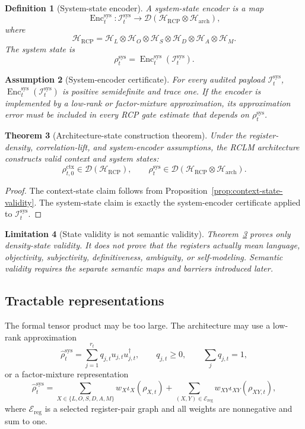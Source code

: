 \documentclass[11pt,a4paper]{article}
\newtheorem{theorem}{Theorem}[section]
\newtheorem{definition}[theorem]{Definition}
\newtheorem{assumption}[theorem]{Assumption}
\newtheorem{limitation}[theorem]{Limitation}
\newcommand{\D}{\mathcal D}
\newcommand{\Hcal}{\mathcal H}
\newcommand{\RCP}{\mathrm{RCP}}
\newcommand{\sys}{\mathrm{sys}}
\newcommand{\ctx}{\mathrm{ctx}}
\newcommand{\arch}{\mathrm{arch}}
\newcommand{\reg}{\mathrm{reg}}
\begin{document}
\begin{definition}[System-state encoder]
A system-state encoder is a map
\[
\operatorname{Enc}_t^{\sys}:\mathcal I_t^{\sys}\to\D(\Hcal_{\RCP}\otimes\Hcal_{\arch}),
\]
where
\[
\Hcal_{\RCP}=\Hcal_L\otimes\Hcal_O\otimes\Hcal_S\otimes\Hcal_D\otimes\Hcal_A\otimes\Hcal_M.
\]
The system state is
\[
\rho_t^{\sys}=\operatorname{Enc}_t^{\sys}(\mathcal I_t^{\sys}).
\]
\end{definition}

\begin{assumption}[System-encoder certificate]
For every audited payload \(\mathcal I_t^{\sys}\), \(\operatorname{Enc}_t^{\sys}(\mathcal I_t^{\sys})\) is positive semidefinite and trace one.  If the encoder is implemented by a low-rank or factor-mixture approximation, its approximation error must be included in every RCP gate estimate that depends on \(\rho_t^{\sys}\).
\end{assumption}

\begin{theorem}[Architecture-state construction theorem]
\label{thm:architecture-state-construction}
Under the register-density, correlation-lift, and system-encoder assumptions, the RCLM architecture constructs valid context and system states:
\[
\rho_{t,0}^{\ctx}\in\D(\Hcal_{\RCP}),
\qquad
\rho_t^{\sys}\in\D(\Hcal_{\RCP}\otimes\Hcal_{\arch}).
\]
\end{theorem}

\begin{proof}
The context-state claim follows from Proposition~\ref{prop:context-state-validity}.  The system-state claim is exactly the system-encoder certificate applied to \(\mathcal I_t^{\sys}\).
\end{proof}

\begin{limitation}[State validity is not semantic validity]
Theorem~\ref{thm:architecture-state-construction} proves only density-state validity.  It does not prove that the registers actually mean language, objectivity, subjectivity, definitiveness, ambiguity, or self-modeling.  Semantic validity requires the separate semantic maps and barriers introduced later.
\end{limitation}

\subsection{Tractable representations}

The formal tensor product may be too large. The architecture may use a low-rank approximation
\[
\widehat\rho_t^{\sys}=\sum_{j=1}^{r_t}q_{j,t}u_{j,t}u_{j,t}^{\dagger},
\qquad q_{j,t}\ge0,
\qquad \sum_jq_{j,t}=1,
\]
or a factor-mixture representation
\[
\widehat\rho_t^{\sys}
=
\sum_{X\in\{L,O,S,D,A,M\}}w_X\iota_X(\rho_{X,t})
+
\sum_{(X,Y)\in\mathcal E_{\reg}}w_{XY}\iota_{XY}(\rho_{XY,t}),
\]
where \(\mathcal E_{\reg}\) is a selected register-pair graph and all weights are nonnegative and sum to one.
\end{document}
